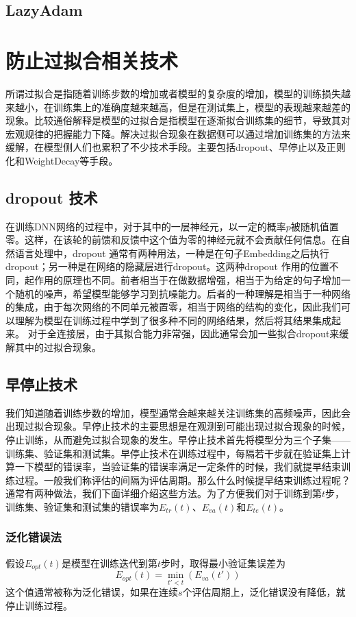 \documentclass[twoside,a4paper,12pt]{book}%
\begin{document}
\subsection{LazyAdam}

\section{防止过拟合相关技术}
所谓过拟合是指随着训练步数的增加或者模型的复杂度的增加，模型的训练损失越来越小，在训练集上的准确度越来越高，但是在测试集上，模型的表现越来越差的现象。比较通俗解释是模型的过拟合是指模型在逐渐拟合训练集的细节，导致其对宏观规律的把握能力下降。解决过拟合现象在数据侧可以通过增加训练集的方法来缓解，在模型侧人们也累积了不少技术手段。主要包括dropout、早停止以及正则化和WeightDecay等手段。
\subsection{dropout 技术}
在训练DNN网络的过程中，对于其中的一层神经元，以一定的概率$p$被随机值置零。这样，在该轮的前馈和反馈中这个值为零的神经元就不会贡献任何信息。在自然语言处理中，dropout 通常有两种用法，一种是在句子Embedding之后执行dropout；另一种是在网络的隐藏层进行dropout。这两种dropout 作用的位置不同，起作用的原理也不同。前者相当于在做数据增强，相当于为给定的句子增加一个随机的噪声，希望模型能够学习到抗噪能力。后者的一种理解是相当于一种网络的集成，由于每次网络的不同单元被置零，相当于网络的结构的变化，因此我们可以理解为模型在训练过程中学到了很多种不同的网络结果，然后将其结果集成起来。
对于全连接层，由于其拟合能力非常强，因此通常会加一些拟合dropout来缓解其中的过拟合现象。
\subsection{早停止技术}
我们知道随着训练步数的增加，模型通常会越来越关注训练集的高频噪声，因此会出现过拟合现象。早停止技术的主要思想是在观测到可能出现过拟合现象的时候，停止训练，从而避免过拟合现象的发生。早停止技术首先将模型分为三个子集——训练集、验证集和测试集。早停止技术在训练过程中，每隔若干步就在验证集上计算一下模型的错误率，当验证集的错误率满足一定条件的时候，我们就提早结束训练过程。一般我们称评估的间隔为评估周期。那么什么时候提早结束训练过程呢？通常有两种做法，我们下面详细介绍这些方法。为了方便我们对于训练到第$t$步，训练集、验证集和测试集的错误率为$E_{tr}(t)$、$E_{va}(t)$和$E_{te}(t)$。
\subsubsection{泛化错误法}
假设$E_{opt}(t)$是模型在训练迭代到第$t$步时，取得最小验证集误差为
$$
E_{opt}(t) = \min_{t'<t}(E_{va}(t'))
$$
这个值通常被称为泛化错误，如果在连续$s$个评估周期上，泛化错误没有降低，就停止训练过程。
\end{document}
